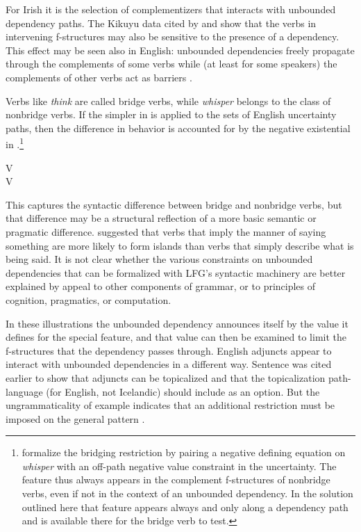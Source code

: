 \documentclass[output=paper,hidelinks]{langscibook}
\begin{document}
For Irish it is the selection of complementizers that interacts with unbounded dependency paths.  The Kikuyu data cited by \citet{zaenen1983} and \citet{dalrymple01} show that the verbs in intervening f-structures may also be sensitive to the presence of a dependency.  This effect may be seen also in English:  unbounded dependencies freely propagate through the complements of some verbs  while (at least for some speakers) the complements of other verbs act as barriers .

\ea
{}\label{think}
\label{whisper}
\z\z

\noindent Verbs like \textit{think} are called bridge verbs, while \textit{whisper} belongs to the class of nonbridge verbs. If the simpler  in  is applied to the sets of English uncertainty paths, then the difference in behavior is accounted for by the negative existential in .\footnote{\citet{DLM:LFG} formalize the bridging restriction by pairing a negative defining equation  on \textit{whisper} with  an off-path negative value constraint  in the uncertainty. The  feature thus always appears in the complement f-structures of nonbridge verbs, even if not in the context of an unbounded dependency.  In the solution outlined here that feature appears always and only along a dependency path and is available there for the bridge verb to test.}

\ea
\ea{} V {}\\
\ex\label{whisperlex} V {\\
                                        }
\z\z

\noindent This captures the syntactic difference between bridge and nonbridge verbs, but that difference may be a structural reflection of a more basic semantic or pragmatic difference.   \citet{erteschik-shir1973on-the-nature} suggested that verbs that imply the manner of saying something are more likely to form islands than verbs that simply describe what is being said.  It is not clear whether the various constraints on unbounded dependencies that can be formalized with LFG's syntactic machinery are better explained by appeal to other components of grammar, or to principles of cognition, pragmatics, or computation.

In these illustrations the unbounded dependency announces itself by the value it defines for the special  feature, and that value can then be examined to limit the f-structures that the dependency passes through.  English adjuncts appear to interact with unbounded dependencies in a different way.  Sentence  was cited earlier to show that adjuncts can be topicalized and that the topicalization path-language (for English, not Icelandic) should include \mb{\ADJ\ (\in)} as an option.  But the ungrammaticality of example  indicates that an additional restriction must be imposed on the general pattern \citep[examples from][]{dalrymple01}.  
\end{document}
